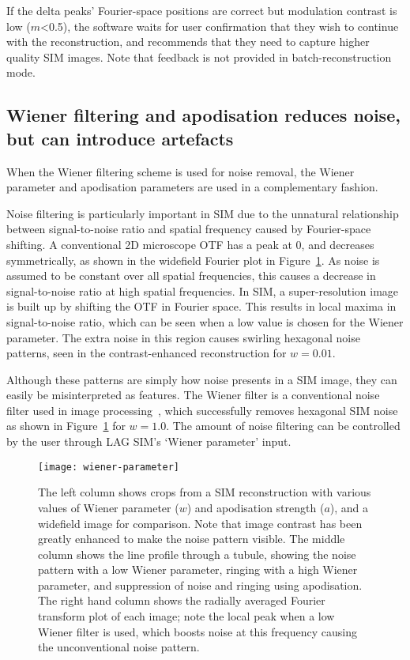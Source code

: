 If the delta peaks' Fourier-space positions are correct but modulation contrast is low ($m$<0.5), the software waits for user confirmation that they wish to continue with the reconstruction, and recommends that they need to capture higher quality SIM images.
Note that feedback is not provided in batch-reconstruction mode.

\subsection{Wiener filtering and apodisation reduces noise, but can introduce artefacts}\label{sec:wiener-recon}
When the Wiener filtering scheme is used for noise removal, the Wiener parameter and apodisation parameters are used in a complementary fashion.

Noise filtering is particularly important in SIM due to the unnatural relationship between signal-to-noise ratio and spatial frequency caused by Fourier-space shifting.
A conventional 2D microscope OTF has a peak at 0, and decreases symmetrically, as shown in the widefield Fourier plot in Figure~\ref{fig:wiener-parameter}.
As noise is assumed to be constant over all spatial frequencies, this causes a decrease in signal-to-noise ratio at high spatial frequencies.
In SIM, a super-resolution image is built up by shifting the OTF in Fourier space.
This results in local maxima in signal-to-noise ratio, which can be seen when a low value is chosen for the Wiener parameter.
The extra noise in this region causes swirling hexagonal noise patterns, seen in the contrast-enhanced reconstruction for $w=0.01$.

Although these patterns are simply how noise presents in a SIM image, they can easily be misinterpreted as features.
The Wiener filter is a conventional noise filter used in image processing~\cite[\textit{ch. 4}]{brown2012introduction}, which successfully removes hexagonal SIM noise as shown in Figure~\ref{fig:wiener-parameter} for $w=1.0$.
The amount of noise filtering can be controlled by the user through LAG SIM's `Wiener parameter' input.


\begin{figure}[p]
\centering
\texttt{[image: wiener-parameter]}
\caption[LAG SIM: The Wiener parameter and apodisation strength must be chosen to minimise artefacts]{The left column shows crops from a SIM reconstruction with various values of Wiener parameter ($w$) and apodisation strength ($a$), and a widefield image for comparison. Note that image contrast has been greatly enhanced to make the noise pattern visible. The middle column shows the line profile through a tubule, showing the noise pattern with a low Wiener parameter, ringing with a high Wiener parameter, and suppression of noise and ringing using apodisation. The right hand column shows the radially averaged Fourier transform plot of each image; note the local peak when a low Wiener filter is used, which boosts noise at this frequency causing the unconventional noise pattern.}
\label{fig:wiener-parameter}
\end{figure}

